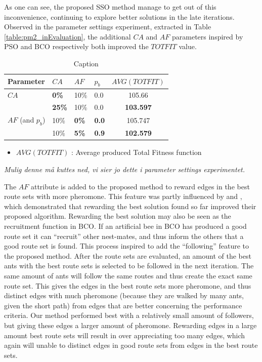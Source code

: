 As one can see, the proposed SSO method manage to get out of this inconvenience, continuing to explore better solutions in the late iterations. Observed in the parameter settings experiment, extracted in Table \vref{table:pm2_inEvaluation}, the additional $CA$ and $AF$ parameters inspired by PSO and BCO respectively both improved the $TOTFIT$ value. 

\begin{table}
    \centering
    \begin{tabular}{|l|l|l|l||c|}
    \hline
    Parameter & $CA$ & $AF$ & $p_b$ & $AVG(TOTFIT)$ \\
    \hline
    $CA$ & \textbf{0\%} & 10\% & 0.0 & 105.66\\
    ~ & \textbf{25\%} & 10\% & 0.0 & \textbf{103.597}\\
    \hline
    $AF$ (and $p_b$) & 10\% & \textbf{0\%} & \textbf{0.0} & 105.747 \\
    ~ & 10\% & \textbf{5\%} & \textbf{0.9} & \textbf{102.579}\\
    \hline
    \end{tabular}
    \caption {Caption}
    \tiny
    \begin{itemize}[noitemsep]
    \item[ ] $AVG(TOTFIT)$ : Average produced Total Fitness function
    \end{itemize}
    \label{table:pm2_inEvaluation}
\end{table}
\emph{\color{blue}Mulig denne må kuttes ned, vi sier jo dette i parameter settings experimentet.}

The $AF$ attribute is added to the proposed method to reward edges in the best route sets with more pheromone. This feature was partly influenced by \citet{tripathi09} and \citet{sedighpour14}, which demonstrated that rewarding the best solution found so far improved their proposed algorithm. Rewarding the best solution may also be seen as the recruitment function in BCO. If an artificial bee in BCO has produced a good route set it can ``recruit'' other nest-mates, and thus inform the others that a good route set is found. This process inspired to add the ``following'' feature to the proposed method. After the route sets are evaluated, an amount of the best ants with the best route sets is selected to be followed in the next iteration. The same amount of ants will follow the same routes and thus create the exact same route set. This gives the edges in the best route sets more pheromone, and thus distinct edges with much pheromone (because they are walked by many ants, given the short path) from edges that are better concerning the performance criteria. Our method performed best with a relatively small amount of followers, but giving these edges a larger amount of pheromone.  Rewarding edges in a large amount best route sets will result in over appreciating too many edges, which again will unable to distinct edges in good route sets from edges in the best route sets. 



